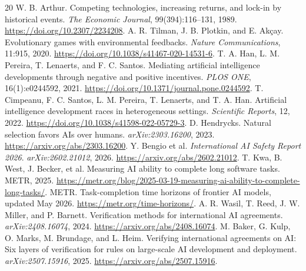 \documentclass[11pt]{article}
\begin{document}
\begin{thebibliography}{20}\setlength{\itemsep}{1pt}
 W. B. Arthur. Competing technologies, increasing returns, and lock-in by historical events. \emph{The Economic Journal}, 99(394):116--131, 1989. \url{https://doi.org/10.2307/2234208}.
 A. R. Tilman, J. B. Plotkin, and E. Ak\c{c}ay. Evolutionary games with environmental feedbacks. \emph{Nature Communications}, 11:915, 2020. \url{https://doi.org/10.1038/s41467-020-14531-6}.
 T. A. Han, L. M. Pereira, T. Lenaerts, and F. C. Santos. Mediating artificial intelligence developments through negative and positive incentives. \emph{PLOS ONE}, 16(1):e0244592, 2021. \url{https://doi.org/10.1371/journal.pone.0244592}.
 T. Cimpeanu, F. C. Santos, L. M. Pereira, T. Lenaerts, and T. A. Han. Artificial intelligence development races in heterogeneous settings. \emph{Scientific Reports}, 12, 2022. \url{https://doi.org/10.1038/s41598-022-05729-3}.
 D. Hendrycks. Natural selection favors AIs over humans. \emph{arXiv:2303.16200}, 2023. \url{https://arxiv.org/abs/2303.16200}.
 Y. Bengio et al. \emph{International AI Safety Report 2026}. \emph{arXiv:2602.21012}, 2026. \url{https://arxiv.org/abs/2602.21012}.
 T. Kwa, B. West, J. Becker, et al. Measuring AI ability to complete long software tasks. METR, 2025. \url{https://metr.org/blog/2025-03-19-measuring-ai-ability-to-complete-long-tasks/}.
 METR. Task-completion time horizons of frontier AI models, updated May 2026. \url{https://metr.org/time-horizons/}.
 A. R. Wasil, T. Reed, J. W. Miller, and P. Barnett. Verification methods for international AI agreements. \emph{arXiv:2408.16074}, 2024. \url{https://arxiv.org/abs/2408.16074}.
 M. Baker, G. Kulp, O. Marks, M. Brundage, and L. Heim. Verifying international agreements on AI: Six layers of verification for rules on large-scale AI development and deployment. \emph{arXiv:2507.15916}, 2025. \url{https://arxiv.org/abs/2507.15916}.
\end{thebibliography}
\end{document}
